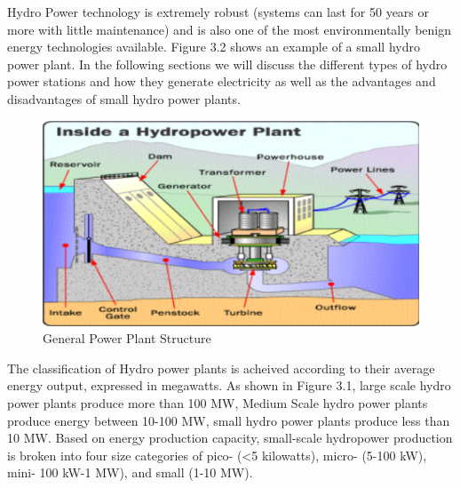 Hydro Power technology is extremely robust (systems can last for 50 years or more with little maintenance) and is also one of the most environmentally benign energy technologies available.\cite{paish2002small} Figure 3.2 shows an example of a small hydro power plant. In the following sections we will discuss the different types of hydro power stations and how they generate electricity as well as the advantages and disadvantages of small hydro power plants.
\begin{figure}[H]
\centering
\includegraphics[scale=0.7]{Images/GeneralPowerPlant.png}
\caption[General Power Plant Structure]{General Power Plant Structure \cite{HydroPP}}
\end{figure}
The classification of Hydro power plants is acheived according to their average energy output, expressed in megawatts.\cite{HydroPP} As shown in Figure 3.1, large scale hydro power plants produce more than 100 MW, Medium Scale hydro power plants produce energy between 10-100 MW, small hydro power plants produce less than 10 MW.\cite{HydroPP,SEIT2017} Based on energy production capacity, small-scale hydropower production is broken into four size categories of pico- (<5 kilowatts), micro- (5-100 kW), mini- 100 kW-1 MW), and small (1-10 MW).\cite{HydroPP}

